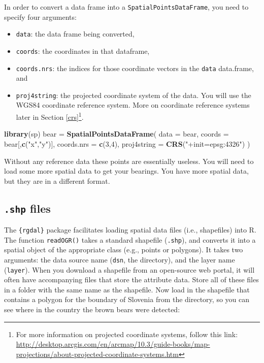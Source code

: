 \documentclass[]{book}
\newenvironment{Shaded}{\begin{snugshade}}{\end{snugshade}}
\newcommand{\DataTypeTok}[1]{\textcolor[rgb]{0.13,0.29,0.53}{#1}}
\newcommand{\DecValTok}[1]{\textcolor[rgb]{0.00,0.00,0.81}{#1}}
\newcommand{\KeywordTok}[1]{\textcolor[rgb]{0.13,0.29,0.53}{\textbf{#1}}}
\newcommand{\NormalTok}[1]{#1}
\newcommand{\StringTok}[1]{\textcolor[rgb]{0.31,0.60,0.02}{#1}}
\providecommand{\tightlist}{%
  \setlength{\itemsep}{0pt}\setlength{\parskip}{0pt}}
\let\rmarkdownfootnote\footnote%
\def\footnote{\protect\rmarkdownfootnote}
\begin{document}
In order to convert a data frame into a \texttt{SpatialPointsDataFrame}, you need to specify four arguments:

\begin{itemize}
\tightlist
\item
  \texttt{data}: the data frame being converted,
\item
  \texttt{coords}: the coordinates in that dataframe,
\item
  \texttt{coords.nrs}: the indices for those coordinate vectors in the \texttt{data} data.frame, and
\item
  \texttt{proj4string}: the projected coordinate system of the data. You will use the WGS84 coordinate reference system. More on coordinate reference systems later in Section \ref{crs}\footnote{For more information on projected coordinate systems, follow this link: \url{http://desktop.arcgis.com/en/arcmap/10.3/guide-books/map-projections/about-projected-coordinate-systems.htm}}.
\end{itemize}

\begin{Shaded}
\begin{Highlighting}[]
\KeywordTok{library}\NormalTok{(sp)}
\NormalTok{bear =}\StringTok{ }\KeywordTok{SpatialPointsDataFrame}\NormalTok{(}
  \DataTypeTok{data =}\NormalTok{ bear,}
  \DataTypeTok{coords =}\NormalTok{ bear[,}\KeywordTok{c}\NormalTok{(}\StringTok{"x"}\NormalTok{,}\StringTok{"y"}\NormalTok{)],}
  \DataTypeTok{coords.nrs =} \KeywordTok{c}\NormalTok{(}\DecValTok{3}\NormalTok{,}\DecValTok{4}\NormalTok{),}
  \DataTypeTok{proj4string =} \KeywordTok{CRS}\NormalTok{(}\StringTok{"+init=epsg:4326"}\NormalTok{)}
\NormalTok{  )}
\end{Highlighting}
\end{Shaded}

Without any reference data these points are essentially useless. You will need to load some more spatial data to get your bearings. You have more spatial data, but they are in a different format.

\hypertarget{shp-files}{%
\subsection{\texorpdfstring{\texttt{.shp} files}{.shp files}}\label{shp-files}}

The \texttt{\{rgdal\}} package \citep{R-rgdal} facilitates loading spatial data files (i.e., shapefiles) into R. The function \texttt{readOGR()} takes a standard shapefile (\texttt{.shp}), and converts it into a spatial object of the appropriate class (e.g., points or polygons). It takes two arguments: the data source name (\texttt{dsn}, the directory), and the layer name (\texttt{layer}). When you download a shapefile from an open-source web portal, it will often have accompanying files that store the attribute data. Store all of these files in a folder with the same name as the shapefile. Now load in the shapefile that contains a polygon for the boundary of Slovenia \citep{svn-cite} from the directory, so you can see where in the country the brown bears were detected:
\end{document}
